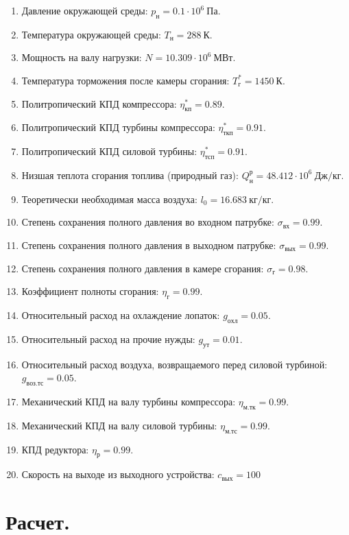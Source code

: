\documentclass[a4paper,10pt]{article}
\begin{document}
    
\begin{enumerate}

	\item Давление окружающей среды: $p_{н} = 0.1 \cdot 10^6\ Па$.
	\item Температура окружающей среды: $T_{н} = 288\ К$.
	\item Мощность на валу нагрузки: $ N = 10.309 \cdot 10^6\ МВт $.
	\item Температура торможения после камеры сгорания: $T_г^* = 1450\ К$.
	\item Политропический КПД компрессора: $\eta^*_{к п} = 0.89 $.
	\item Политропический КПД турбины компрессора: $\eta^*_{ткп} = 0.91$.
	\item Политропический КПД силовой турбины: $\eta^*_{тсп} = 0.91$.
	\item Низшая теплота сгорания топлива (природный газ): $Q^р_н = 48.412 \cdot 10^6\ Дж/кг$.
	\item Теоретически необходимая масса воздуха: $l_0 = 16.683\ кг/кг$.

	\item Степень сохранения полного давления во входном патрубке: $\sigma_{вх} = 0.99$.
	\item Степень сохранения полного давления в выходном патрубке: $\sigma_{вых} = 0.99$.
	\item Степень сохранения полного давления в камере сгорания: $\sigma_г = 0.98$.
	\item Коэффициент полноты сгорания: $\eta_г = 0.99 $.
	\item Относительный расход на охлаждение лопаток: $g_{охл} = 0.05$.
	\item Относительный расход на прочие нужды: $g_{ут} = 0.01$.
	\item Относительный расход воздуха, возвращаемого перед силовой турбиной: $g_{воз.тс} = 0.05$.
	\item Механический КПД на валу турбины компрессора: $\eta_{м.тк} = 0.99$.
	\item Механический КПД на валу силовой турбины: $\eta_{м.тс} = 0.99$.
	\item КПД редуктора: $ \eta_р = 0.99$.
	\item Скорость на выходе из выходного устройства: $ c_{вых} = 100 $

\end{enumerate}


    \section{Расчет.}
\end{document}
